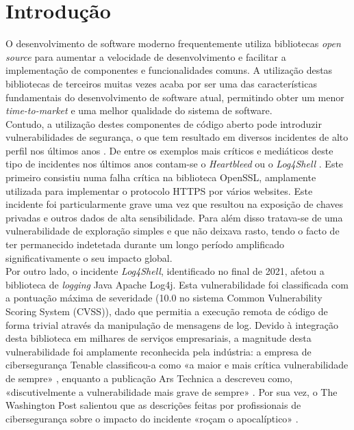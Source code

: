 %
%
\chapter{Introdução} \label{cap:intro}

%
%
O desenvolvimento de software moderno frequentemente utiliza bibliotecas \textit{open source} para aumentar a velocidade de desenvolvimento e facilitar a implementação de componentes e funcionalidades comuns. A utilização destas bibliotecas de terceiros muitas vezes acaba por ser uma das características fundamentais do desenvolvimento de software atual, permitindo obter um menor \textit{time-to-market} e uma melhor qualidade do sistema de software.\cite{Nguyen2019} \\

Contudo, a utilização destes componentes de código aberto pode introduzir vulnerabilidades de segurança, o que tem resultado em diversos incidentes de alto perfil nos últimos anos \cite{CSIS_incidents}. De entre os exemplos mais críticos e mediáticos deste tipo de incidentes nos últimos anos contam-se o \textit{Heartbleed}\cite{CVE_Heartbleed} ou o \textit{Log4Shell}\cite{log4shell} . Este primeiro consistiu numa falha crítica na biblioteca OpenSSL, amplamente utilizada para implementar o protocolo HTTPS por vários websites. Este incidente foi particularmente grave uma vez que resultou na exposição de chaves privadas e outros dados de alta sensibilidade. Para além disso tratava-se de uma vulnerabilidade de exploração simples e que não deixava rasto, tendo o facto de ter permanecido indetetada durante um longo período amplificado significativamente o seu impacto global. \\

Por outro lado, o incidente \textit{Log4Shell}, identificado no final de 2021, afetou a biblioteca de \textit{logging} Java Apache Log4j. Esta vulnerabilidade foi classificada com a pontuação máxima de severidade (10.0 no sistema Common Vulnerability Scoring System (CVSS)), dado que permitia a execução remota de código de forma trivial através da manipulação de mensagens de log. Devido à integração desta biblioteca em milhares de serviços empresariais, a magnitude desta vulnerabilidade foi amplamente reconhecida pela indústria: a empresa de cibersegurança Tenable classificou-a como «a maior e mais crítica vulnerabilidade de sempre» \cite{tenable_log4shell}, enquanto a publicação Ars Technica a descreveu como, «discutivelmente a vulnerabilidade mais grave de sempre» \cite{ars_log4shell}. Por sua vez, o The Washington Post salientou que as descrições feitas por profissionais de cibersegurança sobre o impacto do incidente «roçam o apocalíptico» \cite{washpost_log4shell}. \\

